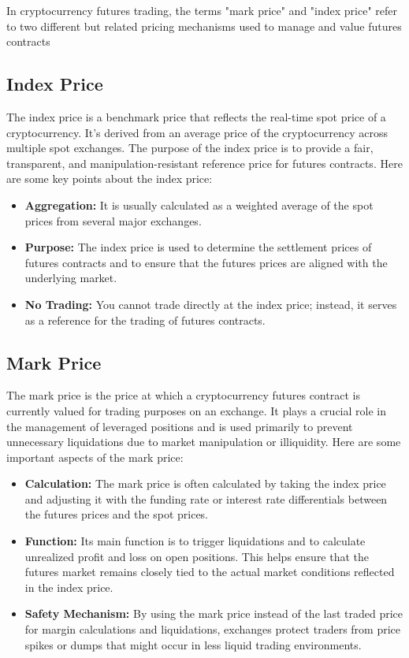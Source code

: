 \documentclass{report}
\begin{document}
    \pagebreak 
    \bigbreak \noindent 
    In cryptocurrency futures trading, the terms "mark price" and "index price" refer to two different but related pricing mechanisms used to manage and value futures contracts
    \bigbreak \noindent 
    \subsection{Index Price}
    \bigbreak \noindent 
    The index price is a benchmark price that reflects the real-time spot price of a cryptocurrency. It's derived from an average price of the cryptocurrency across multiple spot exchanges. The purpose of the index price is to provide a fair, transparent, and manipulation-resistant reference price for futures contracts. Here are some key points about the index price:
    \begin{itemize}
        \item \textbf{Aggregation:} It is usually calculated as a weighted average of the spot prices from several major exchanges.
        \item \textbf{Purpose:} The index price is used to determine the settlement prices of futures contracts and to ensure that the futures prices are aligned with the underlying market.
        \item \textbf{No Trading:} You cannot trade directly at the index price; instead, it serves as a reference for the trading of futures contracts.
    \end{itemize}

    \bigbreak \noindent 
    \subsection{Mark Price}
    \bigbreak \noindent 
    The mark price is the price at which a cryptocurrency futures contract is currently valued for trading purposes on an exchange. It plays a crucial role in the management of leveraged positions and is used primarily to prevent unnecessary liquidations due to market manipulation or illiquidity. Here are some important aspects of the mark price:
    \begin{itemize}
        \item \textbf{Calculation:} The mark price is often calculated by taking the index price and adjusting it with the funding rate or interest rate differentials between the futures prices and the spot prices.
        \item \textbf{Function:} Its main function is to trigger liquidations and to calculate unrealized profit and loss on open positions. This helps ensure that the futures market remains closely tied to the actual market conditions reflected in the index price.
        \item \textbf{Safety Mechanism:} By using the mark price instead of the last traded price for margin calculations and liquidations, exchanges protect traders from price spikes or dumps that might occur in less liquid trading environments.
    \end{itemize}
\end{document}
